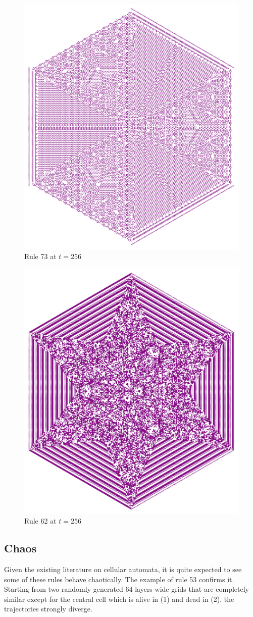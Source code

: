 \documentclass{article}
\begin{document}
\begin{figure}[H]
    \centering
    \includegraphics[width=.618\textwidth]{graphics/behavior/beauty/rule-73-time-256-OneAlive.pdf}
    \caption{Rule 73 at $t=256$}
    \label{fig:rule-73-time-256-OneAlive}
\end{figure}
\begin{figure}[H]
    \centering
    \includegraphics[width=.618\textwidth]{graphics/behavior/beauty/rule-62-time-256-OneAlive.pdf}
    \caption{Rule 62 at $t=256$}
    \label{fig:rule-62-time-256-OneAlive}
\end{figure}

\subsection{Chaos} \label{chaos}
Given the existing literature on cellular automata, it is quite expected to see some of these rules behave chaotically. The example of rule 53 confirms it. Starting from two randomly generated 64 layers wide grids that are completely similar except for the central cell which is alive in (1) and dead in (2), the trajectories strongly diverge.
\end{document}
